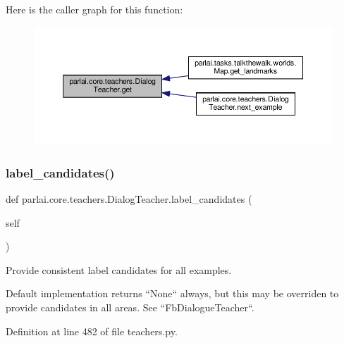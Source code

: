Here is the caller graph for this function\+:
\nopagebreak
\begin{figure}[H]
\begin{center}
\leavevmode
\includegraphics[width=350pt]{classparlai_1_1core_1_1teachers_1_1DialogTeacher_a1988d984bf87370e9a9e58c9b8ca67a8_icgraph}
\end{center}
\end{figure}
\mbox{\label{classparlai_1_1core_1_1teachers_1_1DialogTeacher_a50649105cc9d00bcaa860290d804eac9}} 
\subsubsection{\texorpdfstring{label\+\_\+candidates()}{label\_candidates()}}
{\footnotesize\ttfamily def parlai.\+core.\+teachers.\+Dialog\+Teacher.\+label\+\_\+candidates (\begin{DoxyParamCaption}\item[{}]{self }\end{DoxyParamCaption})}

\begin{DoxyVerb}Provide consistent label candidates for all examples.

Default implementation returns ``None`` always, but this may be overriden
to provide candidates in all areas. See ``FbDialogueTeacher``.
\end{DoxyVerb}
 

Definition at line 482 of file teachers.\+py.

\mbox{\label{classparlai_1_1core_1_1teachers_1_1DialogTeacher_a738c4571db2fee7ce3ab01072f10ed49}} 
